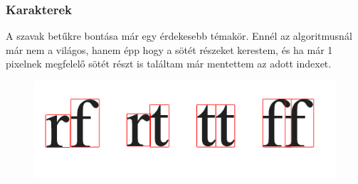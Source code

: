 \documentclass{beamer}
\begin{document}
\begin{frame}[fragile]
\frametitle{Karakterek}

A szavak betűkre bontása már egy érdekesebb témakör. Ennél az algoritmusnál már nem a világos, hanem épp hogy a sötét részeket kerestem, és ha már 1 pixelnek megfelelő sötét részt is találtam már mentettem az adott indexet.

\begin{figure}[!tbp]
  \centering
  \begin{minipage}[b]{0.45\textwidth}
    \includegraphics[width=\textwidth]{images/ligatura.png}
  \end{minipage}
\end{figure}

\end{frame}
\end{document}
